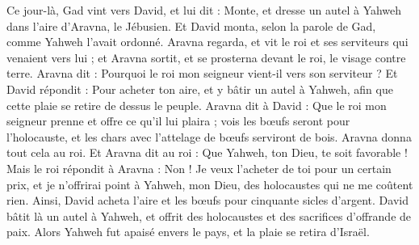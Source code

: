 \begin{multicols}{2}
Ce jour-là, Gad vint vers David, et lui dit : Monte, et dresse un autel à Yahweh dans l'aire d'Aravna, le Jébusien.
Et David monta, selon la parole de Gad, comme Yahweh l'avait ordonné.
Aravna regarda, et vit le roi et ses serviteurs qui venaient vers lui ; et Aravna sortit, et se prosterna devant le roi, le visage contre terre.
Aravna dit : Pourquoi le roi mon seigneur vient-il vers son serviteur ? Et David répondit : Pour acheter ton aire, et y bâtir un autel à Yahweh, afin que cette plaie se retire de dessus le peuple.
Aravna dit à David : Que le roi mon seigneur prenne et offre ce qu'il lui plaira ; vois les bœufs seront pour l'holocauste, et les chars avec l’attelage de bœufs serviront de bois.
Aravna donna tout cela au roi. Et Aravna dit au roi : Que Yahweh, ton Dieu, te soit favorable !
Mais le roi répondit à Aravna : Non ! Je veux l’acheter de toi pour un certain prix, et je n'offrirai point à Yahweh, mon Dieu, des holocaustes qui ne me coûtent rien. Ainsi, David acheta l'aire et les bœufs pour cinquante sicles d'argent.
David bâtit là un autel à Yahweh, et offrit des holocaustes et des sacrifices d’offrande de paix. Alors Yahweh fut apaisé envers le pays, et la plaie se retira d’Israël.
\PPE{}
\end{multicols}

